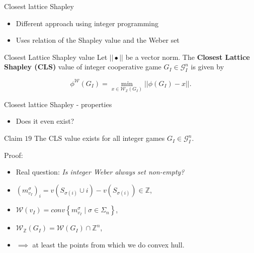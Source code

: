 \documentclass{beamer}
\newcommand{\Z}{\mathbb{Z}}
\begin{document}


\begin{frame}{Closest lattice Shapley}
    \begin{itemize}
        \item Different approach using integer programming
        \item Uses relation of the Shapley value and the Weber set
    \end{itemize}


    \begin{block}{Closest Lattice Shapley value}
        Let $||\bullet||$ be a vector norm. The \textbf{Closest Lattice Shapley (CLS)} value of integer cooperative game $G_I \in \mathcal{G}_I^n$ is given by

        \begin{displaymath}
            \phi^\mathcal{W}(G_I)  = \min_{x \in \mathcal{W}_\Z(G_I)} ||\phi(G_I) - x||.
        \end{displaymath}
    \end{block}
\end{frame}



\begin{frame}{Closest lattice Shapley - properties}

    \begin{itemize}
        \item Does it even exist?
    \end{itemize}


    \begin{block}{Claim $19$}
        The CLS value exists for all integer games $G_I \in \mathcal{G}_I^n$.
    \end{block}

    Proof:
    \begin{itemize}
        \item Real question: \textit{Is integer Weber always set non-empty?}
        \item $\left(m^\sigma_{v_I}\right)_i=v\left(S_{\sigma(i)}\cup i\right)-v\left(S_{\sigma(i)}\right) \in \Z$,
        \item $\mathcal{W}(v_I)=conv\left\{m^{\sigma}_{v_I}\mid \sigma \in \Sigma_n\right\}$,
        \item $\mathcal{W}_{\Z}(G_I) = \mathcal{W}(G_I) \cap \Z^{n}$,
        \item $\implies$ at least the points from which we do convex hull.
    \end{itemize}
\end{frame}
\end{document}
